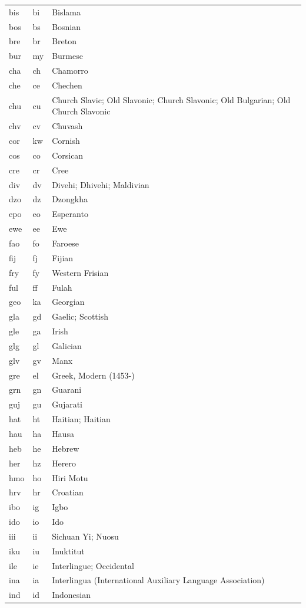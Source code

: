 \begin{longtable}{|L{3cm}|L{3cm}|L{5cm}|}
bis & bi & Bislama\\
bos & bs & Bosnian\\
bre & br & Breton\\
bur & my & Burmese\\
cha & ch & Chamorro\\
che & ce & Chechen\\
chu & cu & Church Slavic; Old Slavonic; Church Slavonic; Old Bulgarian; Old Church Slavonic\\
chv & cv & Chuvash\\
cor & kw & Cornish\\
cos & co & Corsican\\
cre & cr & Cree\\
div & dv & Divehi; Dhivehi; Maldivian\\
dzo & dz & Dzongkha\\
epo & eo & Esperanto\\
ewe & ee & Ewe\\
fao & fo & Faroese\\
fij & fj & Fijian\\
fry & fy & Western Frisian\\
ful & ff & Fulah\\
geo & ka & Georgian\\
gla & gd & Gaelic; Scottish\\
gle & ga & Irish\\
glg & gl & Galician\\
glv & gv & Manx\\
gre & el & Greek, Modern (1453-)\\
grn & gn & Guarani\\
guj & gu & Gujarati\\
hat & ht & Haitian; Haitian\\
hau & ha & Hausa\\
heb & he & Hebrew\\
her & hz & Herero\\
hmo & ho & Hiri Motu\\
hrv & hr & Croatian\\
ibo & ig & Igbo\\
ido & io & Ido\\
iii & ii & Sichuan Yi; Nuosu\\
iku & iu & Inuktitut\\
ile & ie & Interlingue; Occidental\\
ina & ia & Interlingua (International Auxiliary Language Association)\\
ind & id & Indonesian\\

\end{longtable}
